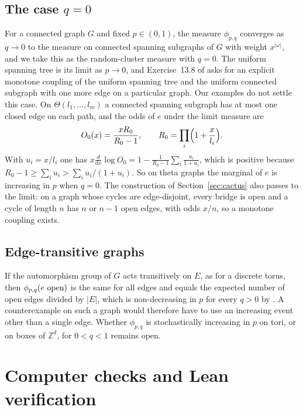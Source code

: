\documentclass[11pt]{amsart}
\theoremstyle{remark}
\numberwithin{equation}{section}
\newcommand{\Z}{\mathbb Z}
\newcommand{\open}{\ \textup{open}}
\begin{document}
\subsection*{The case \texorpdfstring{$q=0$}{q=0}}
For a connected graph $G$ and fixed $p\in(0,1)$, the measure $\phi_{p,q}$ converges as $q\to0$ to the measure on connected spanning subgraphs of $G$ with weight $x^{|\omega|}$, and we take this as the random-cluster measure with $q=0$. The uniform spanning tree is its limit as $p\to0$, and Exercise~13.8 of \cite{Pet24} asks for an explicit monotone coupling of the uniform spanning tree and the uniform connected subgraph with one more edge on a particular graph. Our examples do not settle this case. On $\Theta(l_1,\dots,l_m)$ a connected spanning subgraph has at most one closed edge on each path, and the odds of $e$ under the limit measure are
\[
 O_0(x)=\frac{xR_0}{R_0-1},\qquad R_0=\prod_i\Bigl(1+\frac x{l_i}\Bigr).
\]
With $u_i=x/l_i$ one has $x\frac d{dx}\log O_0=1-\frac1{R_0-1}\sum_i\frac{u_i}{1+u_i}$, which is positive because $R_0-1\ge\sum_iu_i>\sum_iu_i/(1+u_i)$. So on theta graphs the marginal of $e$ is increasing in $p$ when $q=0$. The construction of Section~\ref{sec:cactus} also passes to the limit: on a graph whose cycles are edge-disjoint, every bridge is open and a cycle of length $n$ has $n$ or $n-1$ open edges, with odds $x/n$, so a monotone coupling exists.

\subsection*{Edge-transitive graphs}
If the automorphism group of $G$ acts transitively on $E$, as for a discrete torus, then $\phi_{p,q}(e\open)$ is the same for all edges and equals the expected number of open edges divided by $|E|$, which is non-decreasing in $p$ for every $q>0$ by \cite[Theorem~3.12]{Gri06}. A counterexample on such a graph would therefore have to use an increasing event other than a single edge. Whether $\phi_{p,q}$ is stochastically increasing in $p$ on tori, or on boxes of $\Z^d$, for $0<q<1$ remains open.

\section{Computer checks and Lean verification}\label{sec:lean}
\end{document}
